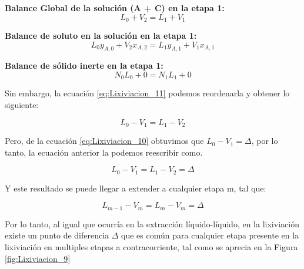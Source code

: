 \documentclass[11pt]{book}
\begin{document}
\textbf{Balance Global de la solución (A + C) en la etapa 1:}
\begin{equation}
    \label{eq:Lixiviacion_11}
    L_0 + V_{2} = L_1 + V_{1}
\end{equation}

\textbf{Balance de soluto en la solución en la etapa 1:}
\begin{equation}
    \label{eq:Lixiviacion_12}
    L_0 y_{A,0} + V_{2} x_{A, 2} = L_1 y_{A,1} + V_{1} x_{A,1}
\end{equation}

\textbf{Balance de sólido inerte en la etapa 1:}
\begin{equation}
    \label{eq:Lixiviacion_13}
    N_0 L_0 + 0 = N_1 L_1  + 0
\end{equation}

Sin embargo, la ecuación \ref{eq:Lixiviacion_11} podemos reordenarla y obtener lo siguiente:

\begin{equation}
    \label{eq:Lixiviacion_14}
    L_0 - V_{1} = L_1 - V_{2}
\end{equation}

Pero, de la ecuación \ref{eq:Lixiviacion_10} obtuvimos que $L_0 - V_{1} = \Delta$, por lo tanto, la ecuación anterior la podemos reescribir como.

\begin{equation}
    \label{eq:Lixiviacion_15}
    L_0 - V_{1} = L_1 - V_{2} = \Delta
\end{equation}

Y este resultado se puede llegar a extender a cualquier etapa m, tal que:

\begin{equation}
    \label{eq:Lixiviacion_16}
    L_{m-1} - V_{m} = L_m - V_{m} = \Delta
\end{equation}

Por lo tanto, al igual que ocurría en la extracción líquido-líquido, en la lixiviación existe un punto de diferencia $\Delta$ que es común para cualquier etapa presente en la lixiviación en multiples etapas a contracorriente, tal como se aprecia en la Figura \ref{fig:Lixiviacion_9}
\end{document}
